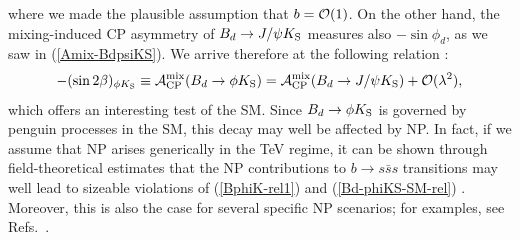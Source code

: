 \documentclass[11pt]{cernrep}
\begin{document}
where we made the plausible assumption that $b={\cal O}(1)$. On the other 
hand, the mixing-induced CP asymmetry of 
$B_d\to J/\psi K_{\rm S}$ measures also $-\sin\phi_d$, as we saw in
(\ref{Amix-BdpsiKS}). We arrive therefore at the following 
relation \cite{RF-EWP-rev,growo}:
\begin{equation}\label{Bd-phiKS-SM-rel}
-(\sin2\beta)_{\phi K_{\rm S}}\equiv
{\cal A}_{\rm CP}^{\rm mix}(B_d\to \phi K_{\rm S}) 
={\cal A}_{\rm CP}^{\rm mix}(B_d\to J/\psi K_{\rm S}) + 
{\cal O}(\lambda^2),
\end{equation}
which offers an interesting test of the SM. Since $B_d\to \phi K_{\rm S}$ is 
governed by penguin processes in the SM, this decay may well be affected by 
NP. In fact, if we assume that NP arises generically in the TeV regime, it can be 
shown through field-theoretical estimates that the NP contributions to  
$b\to s\bar s s$ transitions may well lead to sizeable violations of
(\ref{BphiK-rel1}) and (\ref{Bd-phiKS-SM-rel}) \cite{RF-Phys-Rep,FM-BphiK}. Moreover, 
this is also the case for several specific NP scenarios; for examples, see 
Refs.~\cite{CFMS,Ko,GHK,Z-prime-BpiK}.
\end{document}
